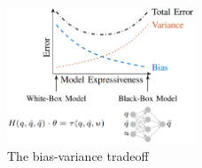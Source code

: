 \begin{figure}
    \centering
    \includegraphics[width=0.5\textwidth]{slike/gupta2019.png}
    \caption[The bias-variance tradeoff]{The bias-variance tradeoff \cite{Gupta2019}}
    \label{fig:StructuredLearning}
\end{figure}

\newpage
